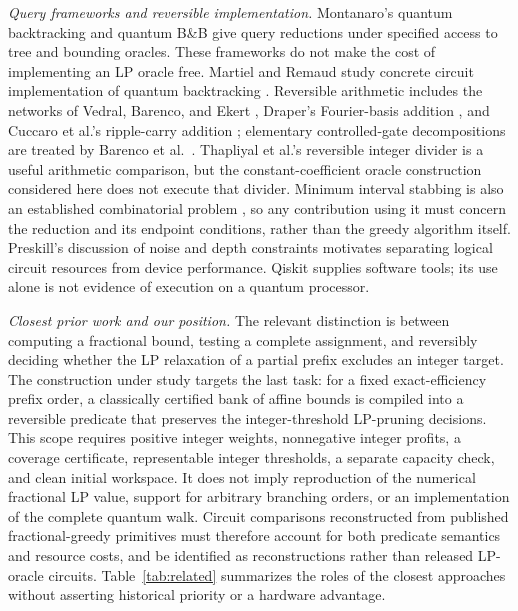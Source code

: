\documentclass[referee,pdflatex,sn-mathphys-num]{sn-jnl}
\theoremstyle{thmstyleone}
\theoremstyle{thmstyletwo}
\begin{document}
\textit{Query frameworks and reversible implementation.} Montanaro's quantum backtracking \cite{ref35} and quantum B\&B \cite{ref24} give query reductions under specified access to tree and bounding oracles. These frameworks do not make the cost of implementing an LP oracle free. Martiel and Remaud study concrete circuit implementation of quantum backtracking \cite{martiel2019}. Reversible arithmetic includes the networks of Vedral, Barenco, and Ekert \cite{vedral1996}, Draper's Fourier-basis addition \cite{draper2000}, and Cuccaro et al.'s ripple-carry addition \cite{cuccaro2004}; elementary controlled-gate decompositions are treated by Barenco et al.\ \cite{barenco1995}. Thapliyal et al.'s reversible integer divider \cite{thapliyal2016} is a useful arithmetic comparison, but the constant-coefficient oracle construction considered here does not execute that divider. Minimum interval stabbing is also an established combinatorial problem \cite{erickson2019algorithms}, so any contribution using it must concern the reduction and its endpoint conditions, rather than the greedy algorithm itself. Preskill's discussion of noise and depth constraints \cite{ref31} motivates separating logical circuit resources from device performance. Qiskit \cite{ref33} supplies software tools; its use alone is not evidence of execution on a quantum processor.

\textit{Closest prior work and our position.} The relevant distinction is between computing a fractional bound, testing a complete assignment, and reversibly deciding whether the LP relaxation of a partial prefix excludes an integer target. The construction under study targets the last task: for a fixed exact-efficiency prefix order, a classically certified bank of affine bounds is compiled into a reversible predicate that preserves the integer-threshold LP-pruning decisions. This scope requires positive integer weights, nonnegative integer profits, a coverage certificate, representable integer thresholds, a separate capacity check, and clean initial workspace. It does not imply reproduction of the numerical fractional LP value, support for arbitrary branching orders, or an implementation of the complete quantum walk. Circuit comparisons reconstructed from published fractional-greedy primitives \cite{wilkening2025,wilkening2025code} must therefore account for both predicate semantics and resource costs, and be identified as reconstructions rather than released LP-oracle circuits. Table~\ref{tab:related} summarizes the roles of the closest approaches without asserting historical priority or a hardware advantage.
\end{document}
